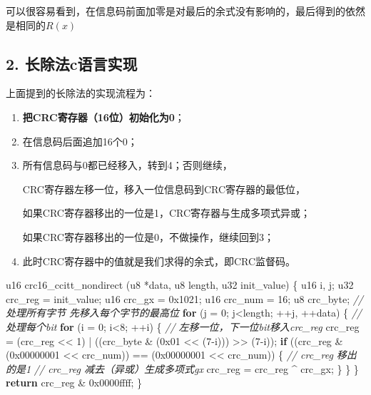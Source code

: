 \documentclass[
]{article}
\newenvironment{Shaded}{}{}
\newcommand{\BaseNTok}[1]{\textcolor[rgb]{0.25,0.63,0.44}{#1}}
\newcommand{\CommentTok}[1]{\textcolor[rgb]{0.38,0.63,0.69}{\textit{#1}}}
\newcommand{\ControlFlowTok}[1]{\textcolor[rgb]{0.00,0.44,0.13}{\textbf{#1}}}
\newcommand{\DecValTok}[1]{\textcolor[rgb]{0.25,0.63,0.44}{#1}}
\newcommand{\NormalTok}[1]{#1}
\begin{document}
可以很容易看到，在信息码前面加零是对最后的余式没有影响的，最后得到的依然是相同的$R(x)$

\hypertarget{header-n109}{%
\subsection{2. 长除法c语言实现}\label{header-n109}}

上面提到的长除法的实现流程为：

\begin{enumerate}
\def\labelenumi{\arabic{enumi}.}
\item
  \textbf{把CRC寄存器（16位）初始化为0}；
\item
  在信息码后面追加16个0；
\item
  所有信息码与0都已经移入，转到4；否则继续，

  CRC寄存器左移一位，移入一位信息码到CRC寄存器的最低位，

  如果CRC寄存器移出的一位是1，CRC寄存器与生成多项式异或；

  如果CRC寄存器移出的一位是0，不做操作，继续回到3；
\item
  此时CRC寄存器中的值就是我们求得的余式，即CRC监督码。
\end{enumerate}

\begin{Shaded}
\begin{Highlighting}[]
\NormalTok{u16 crc16\_ccitt\_nondirect (u8 *data, u8 length, u32 init\_value)}
\NormalTok{\{}
\NormalTok{	u16 i, j;}
\NormalTok{	u32 crc\_reg = init\_value;}
\NormalTok{	u16 crc\_gx = }\BaseNTok{0x1021}\NormalTok{;}
\NormalTok{	u16 crc\_num = }\DecValTok{16}\NormalTok{;}
\NormalTok{	u8 crc\_byte;}
    \CommentTok{// 处理所有字节 先移入每个字节的最高位}
	\ControlFlowTok{for}\NormalTok{ (j = }\DecValTok{0}\NormalTok{; j\textless{}length; ++j, ++data)}
\NormalTok{	\{}
		\CommentTok{// 处理每个bit}
		\ControlFlowTok{for}\NormalTok{ (i = }\DecValTok{0}\NormalTok{; i\textless{}}\DecValTok{8}\NormalTok{; ++i)}
\NormalTok{		\{}
            \CommentTok{// 左移一位，下一位bit移入crc\_reg}
\NormalTok{            crc\_reg = (crc\_reg \textless{}\textless{} }\DecValTok{1}\NormalTok{) | ((crc\_byte \& (}\BaseNTok{0x01}\NormalTok{ \textless{}\textless{} (}\DecValTok{7}\NormalTok{{-}i))) \textgreater{}\textgreater{} (}\DecValTok{7}\NormalTok{{-}i));}
			\ControlFlowTok{if}\NormalTok{ ((crc\_reg \& (}\BaseNTok{0x00000001}\NormalTok{ \textless{}\textless{} crc\_num)) == (}\BaseNTok{0x00000001}\NormalTok{ \textless{}\textless{} crc\_num))}
\NormalTok{			\{}
                \CommentTok{// crc\_reg 移出的是1}
				\CommentTok{// crc\_reg 减去（异或）生成多项式gx}
\NormalTok{                crc\_reg = crc\_reg \^{} crc\_gx;}
\NormalTok{			\}}
\NormalTok{		\}}
\NormalTok{	\}}
	\ControlFlowTok{return}\NormalTok{ crc\_reg \& }\BaseNTok{0x0000ffff}\NormalTok{; }
\NormalTok{\}}
\end{Highlighting}
\end{Shaded}
\end{document}
